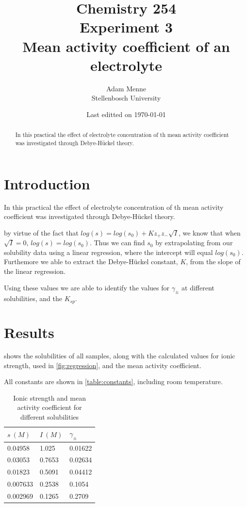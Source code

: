 \documentclass[a4paper, british]{article}
\title{Chemistry 254\\ Experiment 3\\ Mean activity coefficient of an electrolyte}
\date{Last editted on \today}
\author{Adam Menne\\ Stellenbosch University}
\begin{document}
\maketitle

\begin{abstract}
\noindent
In this practical the effect of electrolyte concentration of th mean activity coefficient was investigated through Debye-H{\"u}ckel theory.
\end{abstract}

\tableofcontents

\newpage

\section{Introduction}
In this practical the effect of electrolyte concentration of th mean activity coefficient was investigated through Debye-H{\"u}ckel theory.

by virtue of the fact that \(log(s) = log(s_0) + Kz_+ z_- \sqrt{I}\), we know that when \(\sqrt{I} = 0\), \(log(s) = log(s_0)\). Thus we can find \(s_0\) by extrapolating from our solubility data using a linear regression, where the intercept will equal \(log(s_0)\). Furthemore we able to extract the Debye-H{\"u}ckel constant, \(K\), from the slope of the linear regression.

Using these values we are able to identify the values for \(\gamma_\pm\) at different solubilities, and the \(K_{sp}\).




\section{Results}

 shows the solubilities of all samples, along with the calculated values for ionic strength, used in \cref{fig:regression}, and the mean activity coefficient.

All constants are shown in \cref{table:constants}, including room temperature.

\begin{table}[htb]
    \centering
    \caption{Ionic strength and mean activity coefficient for different solubilities}
    \begin{tabular}{lll}
        \addlinespace
        \toprule
        \(s\ (M)\) & \(I\ (M)\) & \(\gamma_\pm\) \\ 
        \midrule
        0.04958 & 1.025 & 0.01622\\
        0.03053 & 0.7653 & 0.02634\\
        0.01823 & 0.5091 & 0.04412\\
        0.007633 & 0.2538 & 0.1054\\
        0.002969 & 0.1265 & 0.2709\\
        \bottomrule
        \end{tabular}
        \label{table:samples}   
\end{table}
\end{document}
